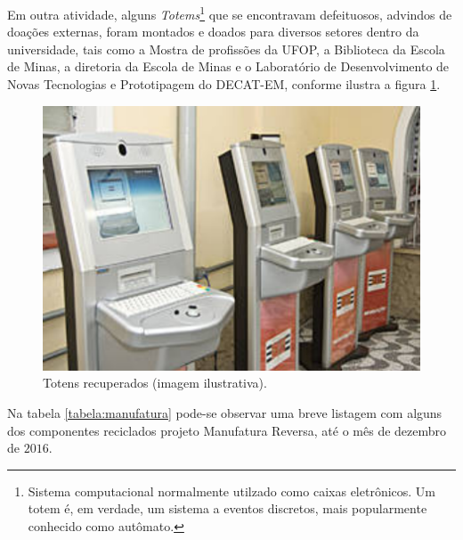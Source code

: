 \documentclass[
	12pt,				%
	openright,			%
	oneside,			%
	a4paper,			%
	english,			%
	spanish,			%
	brazil,				%
	]{abntex2}
\begin{document}
Em outra atividade, alguns \textit{Totems}\footnote{Sistema computacional normalmente utilzado como caixas eletrônicos. Um totem é, em verdade, um sistema a eventos discretos, mais popularmente conhecido como autômato.} que se encontravam defeituosos, advindos de doações externas, foram montados e doados para diversos setores dentro da universidade, tais como a Mostra de profissões da UFOP, a Biblioteca da Escola de Minas, a diretoria da Escola de Minas e o Laboratório de Desenvolvimento de Novas Tecnologias e Prototipagem do DECAT-EM, conforme ilustra a figura \ref{fig:totem}.
\begin{figure}[H]
	\centering
	\includegraphics[scale=1.5]{figuras/totem.pdf}
	\caption{Totens recuperados (imagem ilustrativa).}  \label{fig:totem} 
\end{figure}


Na tabela \ref{tabela:manufatura} pode-se observar uma breve listagem com alguns dos componentes reciclados projeto Manufatura Reversa, até o mês de dezembro de $2016$.
\end{document}
